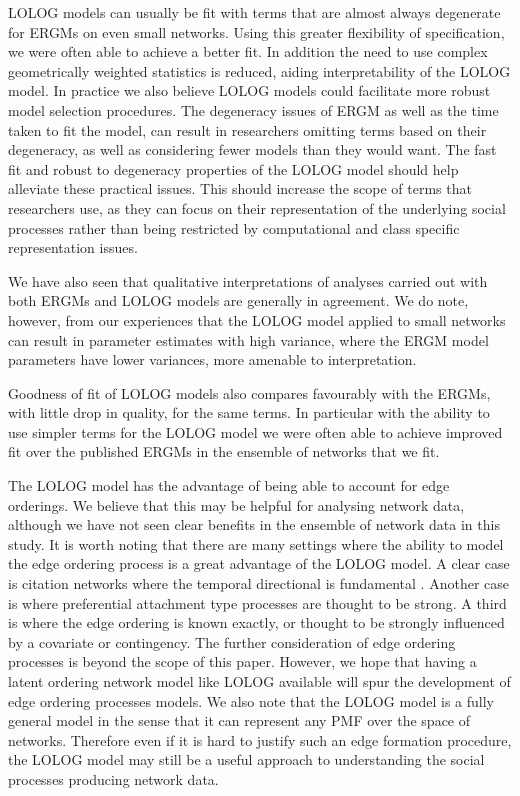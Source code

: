 \documentclass[
]{statsoc}
\begin{document}
LOLOG models can usually be fit with terms that are almost always
degenerate for ERGMs on even small networks. Using this greater
flexibility of specification, we were often able to achieve a better
fit. In addition the need to use complex geometrically weighted
statistics is reduced, aiding interpretability of the LOLOG model. In
practice we also believe LOLOG models could facilitate more robust model
selection procedures. The degeneracy issues of ERGM as well as the time
taken to fit the model, can result in researchers omitting terms based
on their degeneracy, as well as considering fewer models than they would
want. The fast fit and robust to degeneracy properties of the LOLOG
model should help alleviate these practical issues. This should increase
the scope of terms that researchers use, as they can focus on their
representation of the underlying social processes rather than being
restricted by computational and class specific representation issues.

We have also seen that qualitative interpretations of analyses carried
out with both ERGMs and LOLOG models are generally in agreement. We do
note, however, from our experiences that the LOLOG model applied to
small networks can result in parameter estimates with high variance,
where the ERGM model parameters have lower variances, more amenable to
interpretation.

Goodness of fit of LOLOG models also compares favourably with the ERGMs,
with little drop in quality, for the same terms. In particular with the
ability to use simpler terms for the LOLOG model we were often able to
achieve improved fit over the published ERGMs in the ensemble of
networks that we fit.

The LOLOG model has the advantage of being able to account for edge
orderings. We believe that this may be helpful for analysing network
data, although we have not seen clear benefits in the ensemble of
network data in this study. It is worth noting that there are many
settings where the ability to model the edge ordering process is a great
advantage of the LOLOG model. A clear case is citation networks where
the temporal directional is fundamental \citep{McLeveyetal2018}. Another
case is where preferential attachment type processes are thought to be
strong. A third is where the edge ordering is known exactly, or thought
to be strongly influenced by a covariate or contingency. The further
consideration of edge ordering processes is beyond the scope of this
paper. However, we hope that having a latent ordering network model like
LOLOG available will spur the development of edge ordering processes
models. We also note that the LOLOG model is a fully general model in
the sense that it can represent any PMF over the space of networks.
Therefore even if it is hard to justify such an edge formation
procedure, the LOLOG model may still be a useful approach to
understanding the social processes producing network data.
\end{document}
